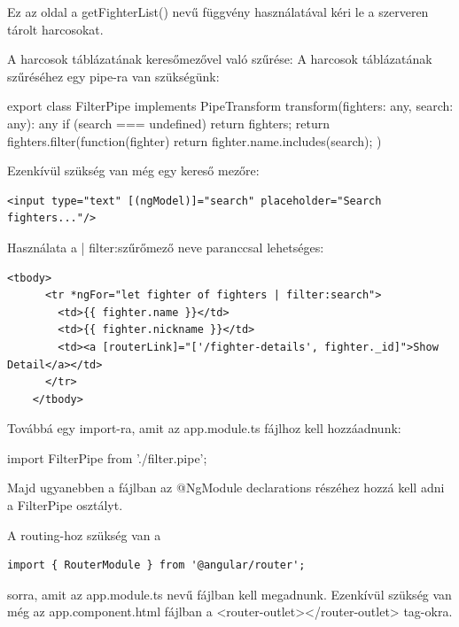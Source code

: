 Ez az oldal a getFighterList() nevű függvény használatával kéri le a szerveren tárolt harcosokat.

A harcosok táblázatának keresőmezővel való szűrése:
A harcosok táblázatának szűréséhez egy pipe-ra van szükségünk:

\begin{cpp}
export class FilterPipe implements PipeTransform {
  transform(fighters: any, search: any): any {
    if (search === undefined) return fighters;
    return fighters.filter(function(fighter){
    	return fighter.name.includes(search);  })}}
\end{cpp}

Ezenkívül szükség van még egy kereső mezőre: 

\begin{verbatim}
<input type="text" [(ngModel)]="search" placeholder="Search fighters..."/>
\end{verbatim}

Használata a | filter:szűrőmező neve paranccsal lehetséges:

\begin{verbatim}
<tbody>
      <tr *ngFor="let fighter of fighters | filter:search">
        <td>{{ fighter.name }}</td>
        <td>{{ fighter.nickname }}</td>
        <td><a [routerLink]="['/fighter-details', fighter._id]">Show Detail</a></td>
      </tr>
    </tbody>
\end{verbatim}

Továbbá egy import-ra, amit az app.module.ts fájlhoz kell hozzáadnunk:

\begin{cpp}
import { FilterPipe } from './filter.pipe';
\end{cpp}

Majd ugyanebben a fájlban az @NgModule declarations részéhez hozzá kell adni a FilterPipe osztályt.

\begin{cpp}
@NgModule({
  declarations: [
    AppComponent,
    HomeComponent,
    FighterComponent,
    FilterPipe
\end{cpp}


A routing-hoz szükség van a

\begin{verbatim}
import { RouterModule } from '@angular/router';
\end{verbatim}

sorra, amit az app.module.ts nevű fájlban kell megadnunk.
Ezenkívül szükség van még az app.component.html fájlban a <router-outlet></router-outlet> tag-okra.

